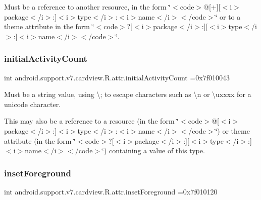 Must be a reference to another resource, in the form \char`\"{}$<$code$>$@\mbox{[}+\mbox{]}\mbox{[}$<$i$>$package$<$/i$>$\+:\mbox{]}$<$i$>$type$<$/i$>$\+:$<$i$>$name$<$/i$>$$<$/code$>$\char`\"{} or to a theme attribute in the form \char`\"{}$<$code$>$?\mbox{[}$<$i$>$package$<$/i$>$\+:\mbox{]}\mbox{[}$<$i$>$type$<$/i$>$\+:\mbox{]}$<$i$>$name$<$/i$>$$<$/code$>$\char`\"{}. \mbox{\label{classandroid_1_1support_1_1v7_1_1cardview_1_1R_1_1attr_a07815f7ffc1978c1f82a1ae4a03e0c80}} 
\subsubsection{\texorpdfstring{initial\+Activity\+Count}{initialActivityCount}}
{\footnotesize\ttfamily int android.\+support.\+v7.\+cardview.\+R.\+attr.\+initial\+Activity\+Count =0x7f010043\hspace{0.3cm}{\ttfamily [static]}}

Must be a string value, using \textquotesingle{}\textbackslash{};\textquotesingle{} to escape characters such as \textquotesingle{}\textbackslash{}n\textquotesingle{} or \textquotesingle{}\textbackslash{}uxxxx\textquotesingle{} for a unicode character. 

This may also be a reference to a resource (in the form \char`\"{}$<$code$>$@\mbox{[}$<$i$>$package$<$/i$>$\+:\mbox{]}$<$i$>$type$<$/i$>$\+:$<$i$>$name$<$/i$>$$<$/code$>$\char`\"{}) or theme attribute (in the form \char`\"{}$<$code$>$?\mbox{[}$<$i$>$package$<$/i$>$\+:\mbox{]}\mbox{[}$<$i$>$type$<$/i$>$\+:\mbox{]}$<$i$>$name$<$/i$>$$<$/code$>$\char`\"{}) containing a value of this type. \mbox{\label{classandroid_1_1support_1_1v7_1_1cardview_1_1R_1_1attr_a95795ef97b87d63d0925b2729ce66ec9}} 
\subsubsection{\texorpdfstring{inset\+Foreground}{insetForeground}}
{\footnotesize\ttfamily int android.\+support.\+v7.\+cardview.\+R.\+attr.\+inset\+Foreground =0x7f010120\hspace{0.3cm}{\ttfamily [static]}}

